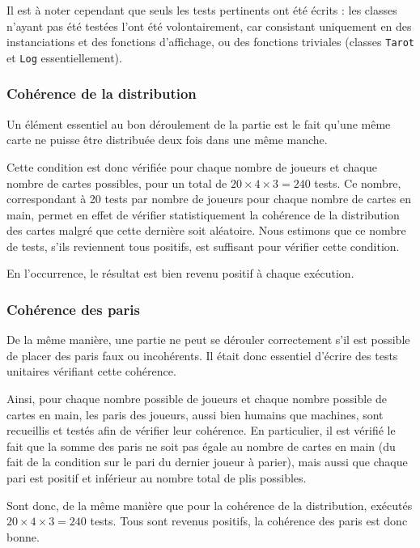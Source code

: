       Il est à noter cependant que seuls les tests pertinents ont été écrits : les classes n'ayant pas été testées l'ont été volontairement, car consistant uniquement en des instanciations et des fonctions d'affichage, ou des fonctions triviales (classes \texttt{Tarot} et \texttt{Log} essentiellement).

      \subsubsection{Cohérence de la distribution}
         Un élément essentiel au bon déroulement de la partie est le fait qu'une même carte ne puisse être distribuée deux fois dans une même manche.

         Cette condition est donc vérifiée pour chaque nombre de joueurs et chaque nombre de cartes possibles, pour un total de $20\times 4\times 3 = 240$ tests.
         Ce nombre, correspondant à 20 tests par nombre de joueurs pour chaque nombre de cartes en main, permet en effet de vérifier statistiquement la cohérence de la distribution des cartes malgré que cette dernière soit aléatoire.
         Nous estimons que ce nombre de tests, s'ils reviennent tous positifs, est suffisant pour vérifier cette condition.

         En l'occurrence, le résultat est bien revenu positif à chaque exécution.

      \subsubsection{Cohérence des paris}
         De la même manière, une partie ne peut se dérouler correctement s'il est possible de placer des paris faux ou incohérents.
         Il était donc essentiel d'écrire des tests unitaires vérifiant cette cohérence.

         Ainsi, pour chaque nombre possible de joueurs et chaque nombre possible de cartes en main, les paris des joueurs, aussi bien humains que machines, sont recueillis et testés afin de vérifier leur cohérence.
         En particulier, il est vérifié le fait que la somme des paris ne soit pas égale au nombre de cartes en main (du fait de la condition sur le pari du dernier joueur à parier), mais aussi que chaque pari est positif et inférieur au nombre total de plis possibles.

         Sont donc, de la même manière que pour la cohérence de la distribution, exécutés $20\times 4\times 3 = 240$ tests.
         Tous sont revenus positifs, la cohérence des paris est donc bonne.

